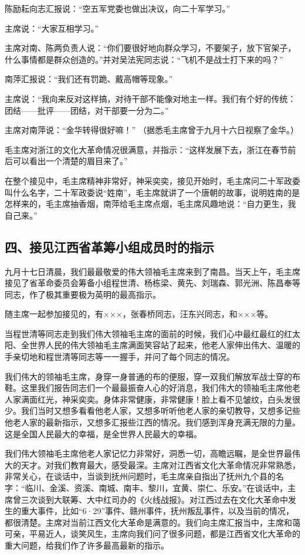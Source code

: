 {陈励耘向志汇报说：“空五军党委也做出决议，向二十军学习。”

主席说：“大家互相学习。”

主席对南、陈两负责人说：“你们要很好地向群众学习，不要架子，放下官架子，什么事情都是群众创造的。”并对吴法宪同志说：“飞机不是战士打下来的吗？”

南萍汇报说：“我们还有罚跪、戴高帽等现象。”

主席说：“我向来反对这样搞，对待干部不能像对地主一样。我们有个好的传统：团结——批评——团结，对干部要一分为二。”

主席对南萍说：“金华转得很好嘛！”  （据悉毛主席曾于九月十六日视察了金华。）

毛主席对浙江的文化大革命情况很满意，并指示：“这样发展下去，浙江在春节前后可以看出一个清楚的眉目来了。”

在整个接见中，毛主席精神非常好，神采奕奕，接见开始时，毛主席问二十军政委叫什么名字，二十军政委说“姓南”，毛主席就讲了一个唐朝的故事，说明姓南的是怎样来的，毛主席抽香烟，南萍给毛主席点烟，毛主席风趣地说：“自力更生，我自己来。”


\subsection{四、接见江西省革筹小组成员时的指示}

九月十七日清晨，我们最最敬爱的伟大领袖毛主席来到了南昌。当天上午，毛主席接见了省革命委员会筹备小组程世清、杨栋梁、黄先、刘瑞森、郭光洲、陈昌奉等同志，作了极其重要极为英明的最高指示。

随主席一起参加接见的，有×××，张春桥同志，汪东兴同志，和×××等。

当程世清等同志走到我们伟大领袖毛主席的面前的时候，我们心中最红最红的红太阳、全世界人民的伟大领袖毛主席满面笑容站了起来，他老人家伸出伟大、温暖的手亲切地和程世清等同志等一一握手，并问了每个同志的情况。

我们伟大的领袖毛主席，身穿一身普通的布的便服，穿一双我们解放军战士穿的布鞋。这里我们报告同志们一个最最振奋人心的好消息，我们伟大的领袖毛主席他老人家满面红光，神采奕奕。身体非常健康，非常健康！脸上看不见皱纹，白头发很少。我们当时又想多看看他老人家，又想多听听他老人家的亲切教导，又想多记些他老人家的最新指示，又想多汇报些江西的情况。我们感到浑身充满无限的力量。这是全国人民最大的幸福，是全世界人民最大的幸福。

我们伟大领袖毛主席他老人家记忆力非常好，洞悉一切，高瞻远瞩，是全世界最伟大的天才。对我们教育最大，感受最深。主席对江西省文化大革命情况非常熟悉，非常关心，在谈话中，当谈到抚州问题时，毛主席亲自指出了抚州九个县的名字：“临川、金溪、资溪、南城、南丰、黎川，宜黄、崇仁、乐安。”在谈话中，主席曾三次谈到大联筹、大中红司办的《火线战报》。对江西过去在文化大革命中发生的重大事件，比如“6·29”事件、赣州事件，抚州叛乱事件，以及当前的情况，都很清楚。主席对当前江西文化大革命是满意的。我们向主席汇报当中，主席和蔼可亲，平易近人，谈笑风生，主席向我们问了很多问题，都是江西省文化大革命的重大问题，给我们作了许多最高最新的指示。

}
